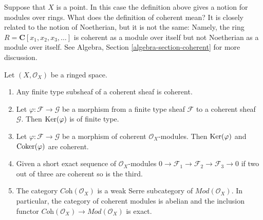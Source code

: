 \begin{example}
\label{example-coherent-not-Noetherian}
Suppose that $X$ is a point. In this case the definition
above gives a notion for modules over rings.
What does the definition of coherent mean?
It is closely related to the notion of Noetherian,
but it is not the same: Namely, the ring
$R = \mathbf{C}[x_1, x_2, x_3, \ldots]$ is coherent
as a module over itself but not Noetherian as a module
over itself. See Algebra, Section \ref{algebra-section-coherent}
for more discussion.
\end{example}

\begin{lemma}
\label{lemma-coherent-abelian}
\begin{reference}
\cite[Chapter I, \S 2, no. 12, Proposition 3, p. 208]{FAC}
\cite[Chapter I, \S 2, no. 13, Theorems 1 and 2 and their
Corollaries, pp. 208--209]{FAC}
\cite[Chapter I, \S 2, no. 15, Proposition 8 and Corollary,
pp. 210--211]{FAC}
\end{reference}
Let $(X, \mathcal{O}_X)$ be a ringed space.
\begin{enumerate}
\item Any finite type subsheaf of a coherent sheaf is coherent.
\item Let $\varphi : \mathcal{F} \to \mathcal{G}$
be a morphism from a finite type sheaf $\mathcal{F}$
to a coherent sheaf $\mathcal{G}$. Then $\mathop{\mathrm{Ker}}(\varphi)$ is of finite type.
\item Let $\varphi : \mathcal{F} \to \mathcal{G}$ be a morphism
of coherent $\mathcal{O}_X$-modules. Then
$\mathop{\mathrm{Ker}}(\varphi)$ and
$\mathop{\mathrm{Coker}}(\varphi)$ are coherent.
\item Given a short exact sequence of $\mathcal{O}_X$-modules
$0 \to \mathcal{F}_1 \to \mathcal{F}_2 \to \mathcal{F}_3 \to 0$
if two out of three are coherent so is the third.
\item The category $\textit{Coh}(\mathcal{O}_X)$ is a weak Serre subcategory
of $\textit{Mod}(\mathcal{O}_X)$. In particular, the category of
coherent modules is abelian and the inclusion functor
$\textit{Coh}(\mathcal{O}_X) \to \textit{Mod}(\mathcal{O}_X)$
is exact.
\end{enumerate}
\end{lemma}

